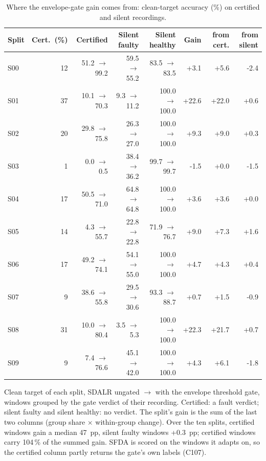 \begin{table}[htbp]
\centering
\caption{Where the envelope-gate gain comes from: clean-target accuracy (\%) on certified and silent recordings.}
\label{tab:gateacc}
\small
\setlength{\tabcolsep}{4pt}
\begin{tabular}{lrrrrrrr}
\toprule
Split & Cert.\ (\%) & Certified & Silent faulty & Silent healthy & Gain & from cert. & from silent \\
\midrule
S00 & 12 & 51.2 $\to$ 99.2 & 59.5 $\to$ 55.2 & 83.5 $\to$ 83.5 & +3.1 & +5.6 & -2.4 \\
S01 & 37 & 10.1 $\to$ 70.3 & 9.3 $\to$ 11.2 & 100.0 $\to$ 100.0 & +22.6 & +22.0 & +0.6 \\
S02 & 20 & 29.8 $\to$ 75.8 & 26.3 $\to$ 27.0 & 100.0 $\to$ 100.0 & +9.3 & +9.0 & +0.3 \\
S03 & 1 & 0.0 $\to$ 0.5 & 38.4 $\to$ 36.2 & 99.7 $\to$ 99.7 & -1.5 & +0.0 & -1.5 \\
S04 & 17 & 50.5 $\to$ 71.0 & 64.8 $\to$ 64.8 & 100.0 $\to$ 100.0 & +3.6 & +3.6 & +0.0 \\
S05 & 14 & 4.3 $\to$ 55.7 & 22.8 $\to$ 22.8 & 71.9 $\to$ 76.7 & +9.0 & +7.3 & +1.6 \\
S06 & 17 & 49.2 $\to$ 74.1 & 54.1 $\to$ 55.0 & 100.0 $\to$ 100.0 & +4.7 & +4.3 & +0.4 \\
S07 & 9 & 38.6 $\to$ 55.8 & 29.5 $\to$ 30.6 & 93.3 $\to$ 88.7 & +0.7 & +1.5 & -0.9 \\
S08 & 31 & 10.0 $\to$ 80.4 & 3.5 $\to$ 5.3 & 100.0 $\to$ 100.0 & +22.3 & +21.7 & +0.7 \\
S09 & 9 & 7.4 $\to$ 76.6 & 45.1 $\to$ 42.0 & 100.0 $\to$ 100.0 & +4.3 & +6.1 & -1.8 \\
\bottomrule
\end{tabular}
\begin{minipage}{\linewidth}\vspace{2pt}\footnotesize Clean target of each split, SDALR ungated $\to$ with the envelope threshold gate, windows grouped by the gate verdict of their recording. Certified: a fault verdict; silent faulty and silent healthy: no verdict. The split's gain is the sum of the last two columns (group share $\times$ within-group change). Over the ten splits, certified windows gain a median 47~pp, silent faulty windows +0.3~pp; certified windows carry 104\,\% of the summed gain. SFDA is scored on the windows it adapts on, so the certified column partly returns the gate's own labels (C107).\end{minipage}
\end{table}
